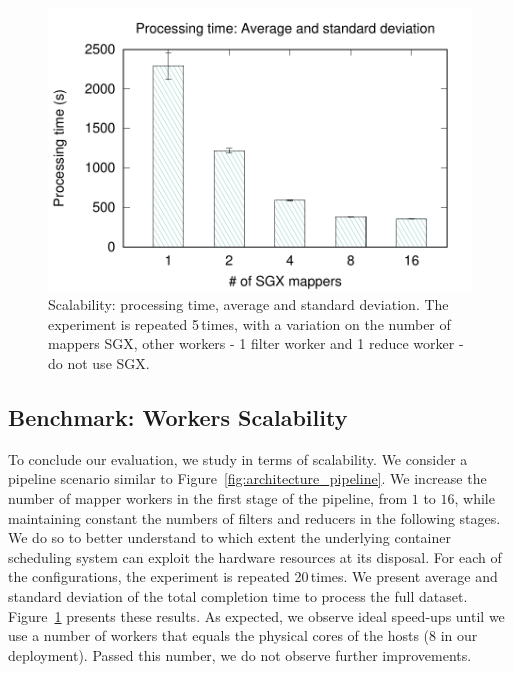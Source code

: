 \begin{figure}[t!]
  \centering  \includegraphics[width=\linewidth]{plots/secure_streams/scalability/sgxmapper_scalability}
  \caption{Scalability: processing time, average and standard deviation. The experiment is repeated 5\,times, with a variation on the number of mappers SGX, other workers - 1 filter worker and 1 reduce worker - do not use SGX.}
  \label{fig:scalability}
\end{figure}

\subsection{Benchmark: Workers Scalability}
To conclude our evaluation, we study \SYS{} in terms of scalability.
We consider a pipeline scenario similar to Figure~\ref{fig:architecture_pipeline}.
We increase the number of mapper workers in the first stage of the pipeline, from $1$ to $16$, while maintaining constant the numbers of filters and reducers in the following stages.
We do so to better understand to which extent the underlying container scheduling system can exploit the hardware resources at its disposal.
For each of the configurations, the experiment is repeated 20\,times.
We present average and standard deviation of the total completion time to process the full dataset.
Figure~\ref{fig:scalability} presents these results.
As expected, we observe ideal speed-ups until we use a number of workers that equals the physical cores of the hosts ($8$ in our deployment).
Passed this number, we do not observe further improvements.


